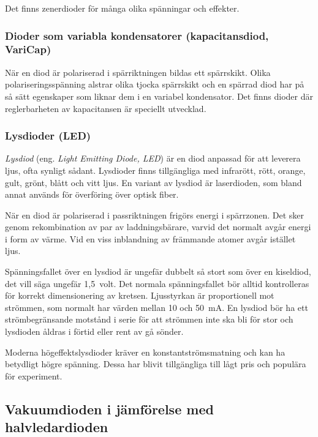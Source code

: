 Det finns zenerdioder för många olika spänningar och effekter.

\subsubsection{Dioder som variabla kondensatorer (kapacitansdiod, VariCap)}
\label{varicap}

När en diod är polariserad i spärriktningen bildas ett spärrskikt.
Olika polariseringsspänning alstrar olika tjocka spärrskikt och en spärrad diod
har på så sätt egenskaper som liknar dem i en variabel kondensator.
Det finns dioder där reglerbarheten av kapacitansen är speciellt utvecklad.

\subsubsection{Lysdioder (LED)}
\label{diod_led}

\emph{Lysdiod} (eng. \emph{Light Emitting Diode, LED}) är en diod anpassad för
att leverera ljus, ofta synligt sådant.
Lysdioder finns tillgängliga med infrarött, rött, orange, gult, grönt,
blått och vitt ljus.
En variant av lysdiod är laserdioden, som bland annat används för överföring
över optisk fiber.

När en diod är polariserad i passriktningen frigörs energi i spärrzonen.
Det sker genom rekombination av par av laddningsbärare, varvid det normalt avgår
energi i form av värme.
Vid en viss inblandning av främmande atomer avgår istället ljus.

Spänningsfallet över en lysdiod är ungefär dubbelt så stort som över en
kiseldiod, det vill säga ungefär 1,5~volt.
Det normala spänningsfallet bör alltid kontrolleras för korrekt dimensionering
av kretsen.
Ljusstyrkan är proportionell mot strömmen, som normalt har värden mellan 10 och
\qty{50}{\milli\ampere}.
En lysdiod bör ha ett strömbegränsande motstånd i serie för att strömmen
inte ska bli för stor och lysdioden åldras i förtid eller rent av gå sönder.

Moderna högeffektslysdioder kräver en
konstant\-strömsmatning och kan ha betydligt
högre spänning.
Dessa har blivit tillgängliga till lågt pris och populära för experiment.

\subsection{Vakuumdioden i jämförelse med halvledardioden}

